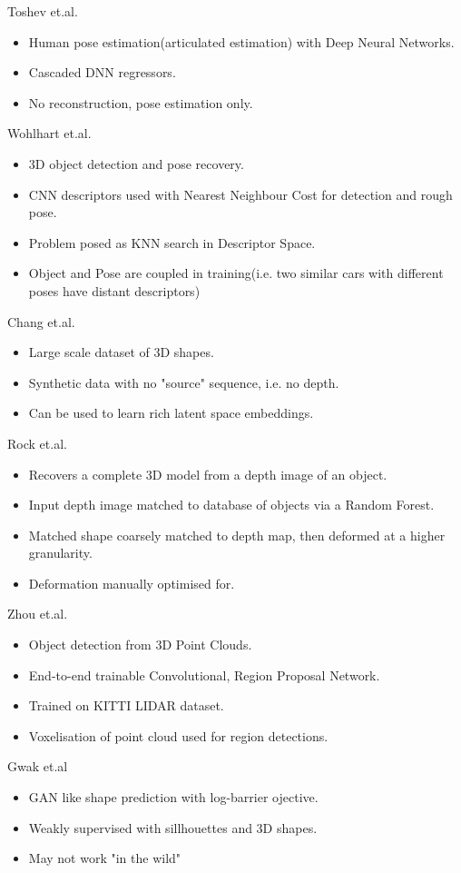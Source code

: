 Toshev et.al. \cite{Toshev2014}
\begin{itemize}
	\item Human pose estimation(articulated estimation) with Deep Neural Networks.
	\item Cascaded DNN regressors.
	\item No reconstruction, pose estimation only.
\end{itemize}

Wohlhart et.al. \cite{Wohlhart2015}
\begin{itemize}
	\item 3D object detection and pose recovery.
	\item CNN descriptors used with Nearest Neighbour Cost for detection and rough pose.
	\item Problem posed as KNN search in Descriptor Space.
	\item Object and Pose are coupled in training(i.e. two similar cars with different poses have distant descriptors)
\end{itemize}

Chang et.al. \cite{Chang2015}
\begin{itemize}
	\item Large scale dataset of 3D shapes.
	\item Synthetic data with no "source" sequence, i.e. no depth.
	\item Can be used to learn rich latent space embeddings.
\end{itemize}

Rock et.al. \cite{Rock2015}
\begin{itemize}
	\item Recovers a complete 3D model from a depth image of an object.
	\item Input depth image matched to database of objects via a Random Forest.
	\item Matched shape coarsely matched to depth map, then deformed at a higher granularity.
	\item Deformation manually optimised for.
\end{itemize}

Zhou et.al. \cite{Zhou2017_2}
\begin{itemize}
	\item Object detection from 3D Point Clouds.
	\item End-to-end trainable Convolutional, Region Proposal Network.
	\item Trained on KITTI LIDAR dataset. \cite{Geiger2013}
	\item Voxelisation of point cloud used for region detections.
\end{itemize}

Gwak et.al \cite{Gwak2017}
\begin{itemize}
	\item GAN like shape prediction with log-barrier ojective.
	\item Weakly supervised with sillhouettes and 3D shapes.
	\item May not work "in the wild"
\end{itemize}

